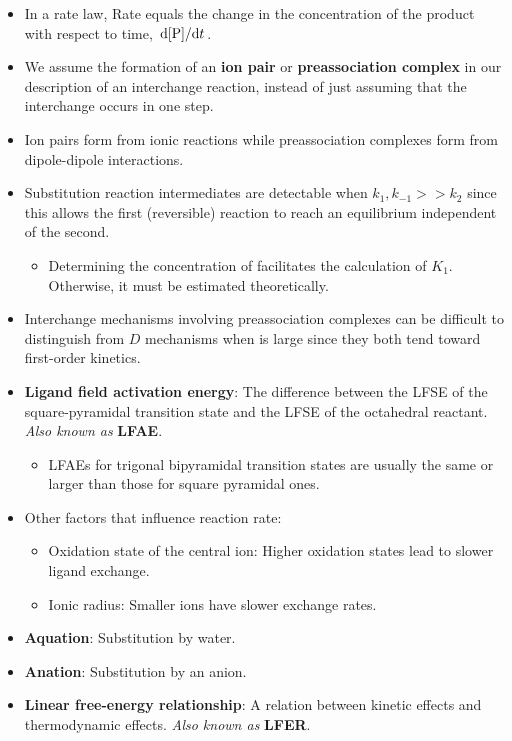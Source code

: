 \documentclass[../notes.tex]{subfiles}
\begin{document}
\begin{itemize}
    \item In a rate law, Rate equals the change in the concentration of the product with respect to time, $\dv*{[\ce{P}]}{t}$.
    \item We assume the formation of an \textbf{ion pair} or \textbf{preassociation complex} in our description of an interchange reaction, instead of just assuming that the interchange occurs in one step.
    \item Ion pairs form from ionic reactions while preassociation complexes form from dipole-dipole interactions.
    \item Substitution reaction intermediates are detectable when $k_1,k_{-1}>>k_2$ since this allows the first (reversible) reaction to reach an equilibrium independent of the second.
    \begin{itemize}
        \item Determining the concentration of \ce{[ML5X*Y]} facilitates the calculation of $K_1$. Otherwise, it must be estimated theoretically.
    \end{itemize}
    \item Interchange mechanisms involving preassociation complexes can be difficult to distinguish from $D$ mechanisms when \ce{[Y]} is large since they both tend toward first-order kinetics.
    \item {}\textbf{Ligand field activation energy}: The difference between the LFSE of the square-pyramidal transition state and the LFSE of the octahedral reactant. \emph{Also known as} \textbf{LFAE}.
    \begin{itemize}
        \item LFAEs for trigonal bipyramidal transition states are usually the same or larger than those for square pyramidal ones.
    \end{itemize}
    \item Other factors that influence reaction rate:
    \begin{itemize}
        \item Oxidation state of the central ion: Higher oxidation states lead to slower ligand exchange.
        \item Ionic radius: Smaller ions have slower exchange rates.
    \end{itemize}
    \item \textbf{Aquation}: Substitution by water.
    \item \textbf{Anation}: Substitution by an anion.
    \item \textbf{Linear free-energy relationship}: A relation between kinetic effects and thermodynamic effects. \emph{Also known as} \textbf{LFER}.

\end{itemize}
\end{document}
